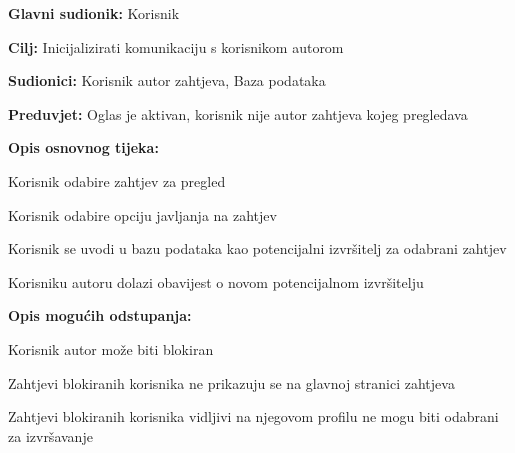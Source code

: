 					\noindent {}
					\begin{packed_item}
						
						\item \textbf{Glavni sudionik: }Korisnik
						\item  \textbf{Cilj:} Inicijalizirati komunikaciju s korisnikom autorom
						\item  \textbf{Sudionici:} Korisnik autor zahtjeva, Baza podataka
						\item  \textbf{Preduvjet:} Oglas je aktivan, korisnik nije autor zahtjeva kojeg pregledava
						\item  \textbf{Opis osnovnog tijeka:}
						
						\item[] \begin{packed_enum}
							
							\item Korisnik odabire zahtjev za pregled
							\item Korisnik odabire opciju javljanja na zahtjev
							\item Korisnik se uvodi u bazu podataka kao potencijalni izvršitelj za odabrani zahtjev
							\item Korisniku autoru dolazi obavijest o novom potencijalnom izvršitelju
						\end{packed_enum}
						
						\item  \textbf{Opis mogućih odstupanja:}
						
						\item[] \begin{packed_item}
							
							\item[1.a] Korisnik autor može biti blokiran
							\item[] \begin{packed_enum}
								
								\item Zahtjevi blokiranih korisnika ne prikazuju se na glavnoj stranici zahtjeva
								\item Zahtjevi blokiranih korisnika vidljivi na njegovom profilu ne mogu biti odabrani za izvršavanje
								
							\end{packed_enum}				
						\end{packed_item}
					\end{packed_item}
				
